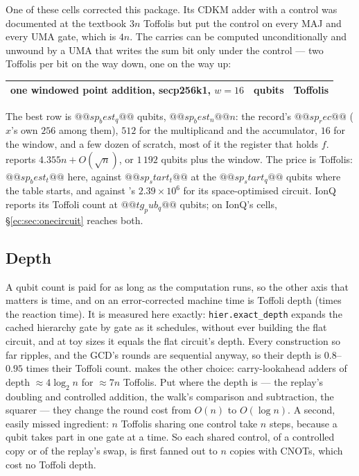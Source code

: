 One of these cells corrected this package. Its CDKM adder with a control was documented at the
textbook $3n$ Toffolis but put the control on every MAJ and every UMA gate, which is $4n$. The
carries can be computed unconditionally and unwound by a UMA that writes the sum bit only under the
control --- two Toffolis per bit on the way down, one on the way up:

\begin{center}\small
\begin{tabular}{lrr}
\toprule
one windowed point addition, secp256k1, $w=16$ & qubits & Toffolis\\
\midrule
\bottomrule
\end{tabular}
\end{center}

The best row is $@@sp_best_q@@$ qubits, $@@sp_best_n@@n$: the record's $@@sp_rec@@$ ($x$'s own $256$
among them), $512$ for the multiplicand and the accumulator, $16$ for the window, and a few dozen of
scratch, most of it the register that holds $f$. \cite{ec:schrott26} reports $4.355n+O(\sqrt n)$,
or $1\,192$ qubits plus the window. The price is Toffolis: $@@sp_best_t@@$ here, against
$@@sp_start_t@@$ at the $@@sp_start_q@@$ qubits where the table starts, and against
\cite{ec:schrott26}'s $2.39\times10^6$ for its space-optimised circuit. IonQ reports its Toffoli
count at $@@tg_pub_q@@$ qubits; on IonQ's cells, \S\ref{ec:sec:onecircuit} reaches both.


\subsection{Depth}\label{ec:sec:depth}

A qubit count is paid for as long as the computation runs, so the other axis that matters is time,
and on an error-corrected machine time is Toffoli depth (times the reaction time). It is measured
here exactly: \texttt{hier.exact\_depth} expands the cached hierarchy gate by gate as it
schedules, without ever building the flat circuit, and at toy sizes it equals the flat circuit's
depth. Every construction so far ripples, and the GCD's rounds are sequential anyway, so their
depth is $0.8$--$0.95$ times their Toffoli count. \cite{ec:kim26} makes the other choice:
carry-lookahead adders \cite{ec:dkrs04} of depth $\approx4\log_2 n$ for $\approx7n$ Toffolis.
Put where the depth is --- the replay's doubling and controlled addition, the walk's comparison and
subtraction, the squarer --- they change the round cost from $O(n)$ to $O(\log n)$. A second, easily
missed ingredient: $n$ Toffolis sharing one control take $n$ steps, because a qubit takes part in
one gate at a time. So each shared control, of a controlled copy or of the replay's swap, is first
fanned out to $n$ copies with CNOTs, which cost no Toffoli depth.


